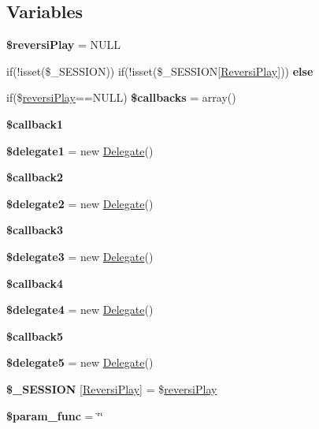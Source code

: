 \subsection*{Variables}
\begin{DoxyCompactItemize}
\item 
\mbox{\label{index_8php_ad872a12dc10a4f9ae852e62a8796db82}} 
{\bfseries \$reversi\+Play} = N\+U\+LL
\item 
if(!isset(\$\+\_\+\+S\+E\+S\+S\+I\+ON)) if(!isset(\$\+\_\+\+S\+E\+S\+S\+I\+ON\mbox{[}\textquotesingle{}\hyperlink{class_reversi_play}{Reversi\+Play}\textquotesingle{}\mbox{]})) {\bfseries else}
\item 
\mbox{\label{index_8php_a1e83c87da7f16978ed53dceedbbe86d6}} 
if(\$\hyperlink{index_8php_a81e6891a5c38d4d0dedd74382f3e9353}{reversi\+Play}==N\+U\+LL) {\bfseries \$callbacks} = array()
\item 
{\bfseries \$callback1}
\item 
\mbox{\label{index_8php_aba2a8edfe4972d57aa4c53fc31995e8d}} 
{\bfseries \$delegate1} = new \hyperlink{class_delegate}{Delegate}()
\item 
{\bfseries \$callback2}
\item 
\mbox{\label{index_8php_a2d3c8e8c0bf83d599b5ac97ba294e437}} 
{\bfseries \$delegate2} = new \hyperlink{class_delegate}{Delegate}()
\item 
{\bfseries \$callback3}
\item 
\mbox{\label{index_8php_a14ad8f6765b9a92c2ad69c0a99790383}} 
{\bfseries \$delegate3} = new \hyperlink{class_delegate}{Delegate}()
\item 
{\bfseries \$callback4}
\item 
\mbox{\label{index_8php_af51dcdc9eb458e69697c29779921c7a2}} 
{\bfseries \$delegate4} = new \hyperlink{class_delegate}{Delegate}()
\item 
{\bfseries \$callback5}
\item 
\mbox{\label{index_8php_a3062b5ce5d3cab88753f359b111291e6}} 
{\bfseries \$delegate5} = new \hyperlink{class_delegate}{Delegate}()
\item 
\mbox{\label{index_8php_ab4d67fcfbb46404e83f63f487a90fcfb}} 
{\bfseries \$\+\_\+\+S\+E\+S\+S\+I\+ON} \mbox{[}\textquotesingle{}\hyperlink{class_reversi_play}{Reversi\+Play}\textquotesingle{}\mbox{]} = \$\hyperlink{index_8php_a81e6891a5c38d4d0dedd74382f3e9353}{reversi\+Play}
\item 
\mbox{\label{index_8php_aea6b1ffc346118905fa209276f4b011f}} 
{\bfseries \$param\+\_\+func} = \char`\"{}\char`\"{}
\end{DoxyCompactItemize}


